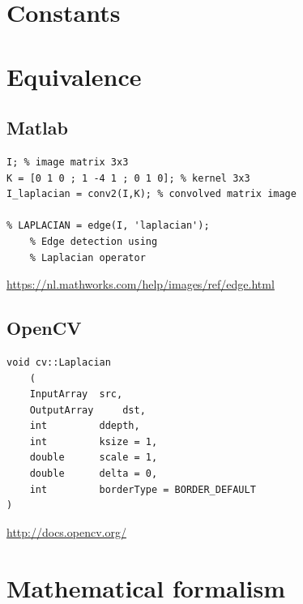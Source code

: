 \documentclass[12pt,a4paper]{article}
\begin{document}
\vspace{0.5cm}

\section*{Constants}


\newpage

\section*{Equivalence}
\subsection*{Matlab}

\lstset{language=Matlab}
\begin{lstlisting}
I; % image matrix 3x3
K = [0 1 0 ; 1 -4 1 ; 0 1 0]; % kernel 3x3
I_laplacian = conv2(I,K); % convolved matrix image 

% LAPLACIAN = edge(I, 'laplacian'); 
	% Edge detection using 
	% Laplacian operator

\end{lstlisting}

\url{https://nl.mathworks.com/help/images/ref/edge.html}


\subsection*{OpenCV}

\lstset{language=C++}
\begin{lstlisting}
void cv::Laplacian	
	(	
	InputArray 	src,
	OutputArray 	dst,
	int 		ddepth,
	int 		ksize = 1,
	double 		scale = 1,
	double 		delta = 0,
	int 		borderType = BORDER_DEFAULT 
)		

\end{lstlisting}

\url{http://docs.opencv.org/}

\section*{Mathematical formalism}
\end{document}
